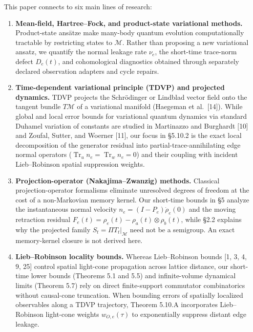 \documentclass[
  11pt,
]{article}
\providecommand{\tightlist}{%
  \setlength{\itemsep}{0pt}\setlength{\parskip}{0pt}}
\providecommand{\tightlist}{%
  \setlength{\itemsep}{0pt}\setlength{\parskip}{0pt}}
\begin{document}
This paper connects to six main lines of research:

\begin{enumerate}
\def\labelenumi{\arabic{enumi}.}
\tightlist
\item
  \textbf{Mean-field, Hartree--Fock, and product-state variational methods.} Product-state ansätze make many-body quantum evolution computationally tractable by restricting states to \(\mathcal{M}\). Rather than proposing a new variational ansatz, we quantify the normal leakage rate \(\nu_e\), the short-time trace-norm defect \(D_e(t)\), and cohomological diagnostics obtained through separately declared observation adapters and cycle repairs.
\item
  \textbf{Time-dependent variational principle (TDVP) and projected dynamics.} TDVP projects the Schrödinger or Lindblad vector field onto the tangent bundle \(T\mathcal{M}\) of a variational manifold (Haegeman et al.~{[}14{]}). While global and local error bounds for variational quantum dynamics via standard Duhamel variation of constants are studied in Martinazzo and Burghardt {[}10{]} and Zoufal, Sutter, and Woerner {[}11{]}, our focus in §5.10.2 is the exact local decomposition of the generator residual into partial-trace-annihilating edge normal operators (\(\operatorname{Tr}_u n_e = \operatorname{Tr}_w n_e = 0\)) and their coupling with incident Lieb--Robinson spatial suppression weights.
\item
  \textbf{Projection-operator (Nakajima--Zwanzig) methods.} Classical projection-operator formalisms eliminate unresolved degrees of freedom at the cost of a non-Markovian memory kernel. Our short-time bounds in §5 analyze the instantaneous normal velocity \(n_e=(I-P_e)\dot\rho_e(0)\) and the moving retraction residual \(F_e(t)=\rho_e(t)-\rho_a(t)\otimes\rho_b(t)\), while §2.2 explains why the projected family \(S_t=\Pi T_t|_{\mathcal{M}}\) need not be a semigroup. An exact memory-kernel closure is not derived here.
\item
  \textbf{Lieb--Robinson locality bounds.} Whereas Lieb--Robinson bounds {[}1, 3, 4, 9, 25{]} control spatial light-cone propagation across lattice distance, our short-time lower bounds (Theorems 5.1 and 5.5) and infinite-volume dynamical limits (Theorem 5.7) rely on direct finite-support commutator combinatorics without causal-cone truncation. When bounding errors of spatially localized observables along a TDVP trajectory, Theorem 5.10.A incorporates Lieb--Robinson light-cone weights \(w_{O,e}(\tau)\) to exponentially suppress distant edge leakage.

\end{enumerate}
\end{document}
